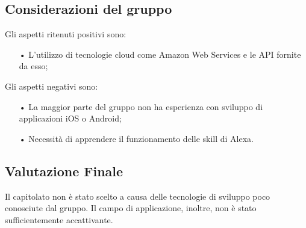 \subsection{Considerazioni del gruppo}
Gli aspetti ritenuti positivi sono:
\begin{itemize}

\item[•] L'utilizzo di tecnologie cloud come Amazon Web Services e le API fornite da esso;

\end{itemize}

Gli aspetti negativi sono: 
\begin{itemize}

\item[•] La maggior parte del gruppo non ha esperienza con sviluppo di applicazioni iOS o Android;
\item[•] Necessità di apprendere il funzionamento delle skill di Alexa.

\end{itemize}

\subsection{Valutazione Finale}
Il capitolato non è stato scelto a causa delle tecnologie di sviluppo poco conosciute dal gruppo. Il campo di applicazione, inoltre, non è stato sufficientemente accattivante.
